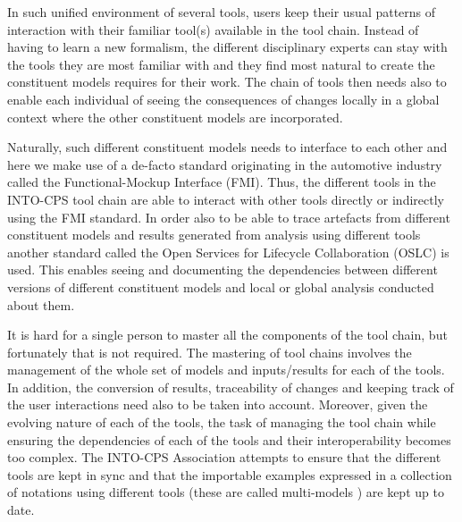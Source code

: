 In such unified environment of several tools, users keep their usual patterns
of interaction with their familiar tool(s) available in the tool chain.
Instead of having to learn a new formalism, the different disciplinary experts can stay with the tools they are most familiar with and they find most natural to create the constituent models requires for their work.
The chain of tools then needs also to enable each individual of seeing the consequences of changes locally in a global context where the other constituent models are incorporated.

Naturally, such different constituent models needs to interface to each other and here we make use of a de-facto standard originating in the automotive industry called the Functional-Mockup Interface (FMI). 
Thus, the different tools in the INTO-CPS tool chain are able to interact with other tools directly or indirectly using the FMI standard. 
In order also to be able to trace artefacts from different constituent models and results generated from analysis using different tools another standard called the Open Services for Lifecycle Collaboration (OSLC) is used. This enables seeing and documenting the dependencies between different versions of different constituent models and local or global analysis conducted about them.

It is hard for a single person to master all the components of the tool chain, but fortunately that is not required.
The mastering of tool chains involves the management of the whole set
of models and inputs/results for each of the tools. In addition, the conversion
of results, traceability of changes and keeping track of the user interactions
need also to be taken into account.  
Moreover, given the evolving nature of
each of the tools, the task of managing the tool chain while ensuring the
dependencies of each of the tools and their interoperability becomes too
complex. The INTO-CPS Association attempts to ensure that the different tools are kept in sync and that the importable examples expressed in a collection of notations using different tools  (these are called multi-models ) are kept up to date.

